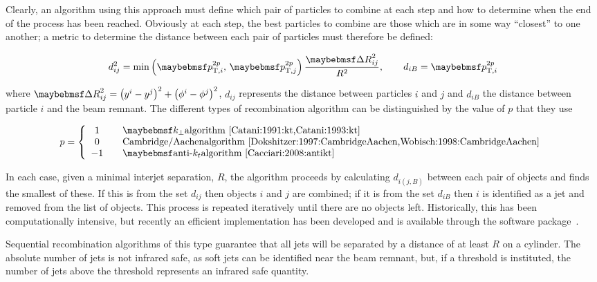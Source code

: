 Clearly, an algorithm using this approach must define which pair of particles to combine at each step and how to determine when the end of the process has been reached.
Obviously at each step, the best particles to combine are those which are in some way ``closest'' to one another; a metric to determine the distance
between each pair of particles must therefore be defined:

\begin{equation}
  d_{ij}^2 = \min\left( \pTrecomb{i}, \, \pTrecomb{j} \right) \frac{\DeltaR_{ij}^2}{R^2}, \qquad d_{iB} = \pTrecomb{i}
\end{equation}

\noindent where $\DeltaR_{ij}^2 = \left(y^i-y^j\right)^2 + \left(\phi^i-\phi^j\right)^2$, $d_{ij}$ represents the distance between particles $i$ and $j$  and $d_{iB}$ the distance between particle $i$ and the beam remnant.
The different types of recombination algorithm can be distinguished by the value of $p$ that they use

\begin{equation}
  p = \left\{
  \begin{array}{c l}
    1 & \quad \text{\kt algorithm~\cite{Catani:1991:kt,Catani:1993:kt}}\\
    0 & \quad \text{\CA algorithm~\cite{Dokshitzer:1997:CambridgeAachen,Wobisch:1998:CambridgeAachen}}\\
    -1 & \quad \text{\akt algorithm~\cite{Cacciari:2008:antikt}}
  \end{array} \right.
\end{equation}

In each case, given a minimal interjet separation, $R$, the algorithm proceeds by calculating $d_{i(j,B)}$ between each pair of objects and finds the smallest of these.
If this is from the set $d_{ij}$ then objects $i$ and $j$ are combined; if it is from the set $d_{iB}$ then $i$ is identified as a jet and removed from
the list of objects.
This process is repeated iteratively until there are no objects left.
Historically, this has been computationally intensive, but recently an efficient implementation has been developed and is available through the \fastjet software package~\cite{Cacciari:2005:fastjet,Cacciari:2012:fastjet}.

Sequential recombination algorithms of this type guarantee that all jets will be separated by a distance of at least $R$ on a \yphi cylinder.
The absolute number of jets is not infrared safe, as soft jets can be identified near the beam remnant, but, if a \pT threshold is instituted, the number of jets above the threshold represents an infrared safe quantity.

